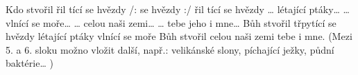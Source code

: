 \begin{TEXT}{Kdo stvořil}
\SLOKA {} řil tící se hvězdy \NL
/:  se hvězdy :/ \NL
{} řil tící se hvězdy \NL
{}  
\SLOKA … létající ptáky…
\SLOKA … vlnící se moře… 
\SLOKA … celou naši zemi… 
\SLOKA … tebe jeho i mne… 
\SLOKA Bůh stvořil třpytící se hvězdy \NL
létající ptáky vlnící se moře \NL
Bůh stvořil celou naši zemi tebe i mne. 
\SLOKA* (Mezi 5. a 6. sloku          možno vložit další, např.: \NL
velikánské slony, píchající ježky, půdní baktérie… )
\end{TEXT}
